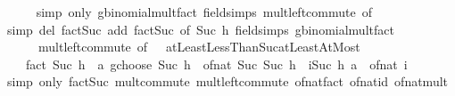 \begin{isabellebody}
\ \ \ \ \isamarkupfalse%
\ {\isacharparenleft}{\kern0pt}simp\ only{\isacharcolon}{\kern0pt}\ gbinomial{\isacharunderscore}{\kern0pt}mult{\isacharunderscore}{\kern0pt}fact\ field{\isacharunderscore}{\kern0pt}simps\ mult{\isachardot}{\kern0pt}left{\isacharunderscore}{\kern0pt}commute\ {\isacharbrackleft}{\kern0pt}of\ {\isacharunderscore}{\kern0pt}\ {\isachardoublequoteopen}{}{\isachardoublequoteclose}{\isacharbrackright}{\kern0pt}{\isacharparenright}{\kern0pt}\isanewline
\ \ \ \ \isamarkupfalse%
\ {\isacharparenleft}{\kern0pt}simp\ del{\isacharcolon}{\kern0pt}\ fact{\isacharunderscore}{\kern0pt}Suc\ add{\isacharcolon}{\kern0pt}\ fact{\isacharunderscore}{\kern0pt}Suc\ {\isacharbrackleft}{\kern0pt}of\ {\isachardoublequoteopen}Suc\ h{\isachardoublequoteclose}{\isacharbrackright}{\kern0pt}\ field{\isacharunderscore}{\kern0pt}simps\ gbinomial{\isacharunderscore}{\kern0pt}mult{\isacharunderscore}{\kern0pt}fact\isanewline
\ \ \ \ \ \ mult{\isachardot}{\kern0pt}left{\isacharunderscore}{\kern0pt}commute\ {\isacharbrackleft}{\kern0pt}of\ {\isacharunderscore}{\kern0pt}\ {\isachardoublequoteopen}{}{\isachardoublequoteclose}{\isacharbrackright}{\kern0pt}\ atLeastLessThanSuc{\isacharunderscore}{\kern0pt}atLeastAtMost{\isacharparenright}{\kern0pt}\isanewline
\ \ \ \ \isamarkupfalse%
\isanewline
\ \ \isamarkupfalse%
\ \isamarkupfalse%
\ {\isachardoublequoteopen}{\isasymdots}\ {\isacharequal}{\kern0pt}\isanewline
\ \ \ \ {\isacharparenleft}{\kern0pt}fact\ {\isacharparenleft}{\kern0pt}Suc\ h{\isacharparenright}{\kern0pt}\ {\isacharasterisk}{\kern0pt}\ {\isacharparenleft}{\kern0pt}a\ gchoose\ Suc\ h{\isacharparenright}{\kern0pt}{\isacharparenright}{\kern0pt}\ {\isacharasterisk}{\kern0pt}\ of{\isacharunderscore}{\kern0pt}nat\ {\isacharparenleft}{\kern0pt}Suc\ {\isacharparenleft}{\kern0pt}Suc\ h{\isacharparenright}{\kern0pt}{\isacharparenright}{\kern0pt}\ {\isacharplus}{\kern0pt}\ {\isacharparenleft}{\kern0pt}{\isasymProd}i{\isacharequal}{\kern0pt}{}{\isachardot}{\kern0pt}{\isachardot}{\kern0pt}Suc\ h{\isachardot}{\kern0pt}\ a\ {\isacharminus}{\kern0pt}\ of{\isacharunderscore}{\kern0pt}nat\ i{\isacharparenright}{\kern0pt}{\isachardoublequoteclose}\isanewline
\ \ \ \ \isamarkupfalse%
\ {\isacharparenleft}{\kern0pt}simp\ only{\isacharcolon}{\kern0pt}\ fact{\isacharunderscore}{\kern0pt}Suc\ mult{\isachardot}{\kern0pt}commute\ mult{\isachardot}{\kern0pt}left{\isacharunderscore}{\kern0pt}commute\ of{\isacharunderscore}{\kern0pt}nat{\isacharunderscore}{\kern0pt}fact\ of{\isacharunderscore}{\kern0pt}nat{\isacharunderscore}{\kern0pt}id\ of{\isacharunderscore}{\kern0pt}nat{\isacharunderscore}{\kern0pt}mult{\isacharparenright}{\kern0pt}\isanewline

\end{isabellebody}
